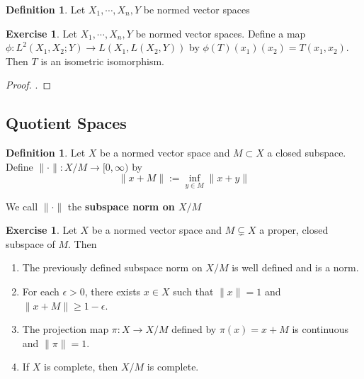 \documentclass[12pt]{amsart}
\theoremstyle{definition}
\newtheorem{defn}[definition]{Definition}
\newtheorem{ex}[definition]{Exercise}
\newcommand{\ep}{\epsilon}
\newcommand{\Rg}{[0,\infty)}
\begin{document}
	
	\begin{defn}
	Let $X_1, \cdots, X_n, Y$ be normed vector spaces
	\end{defn}
	
	
	\begin{ex}
	Let $X_1, \cdots, X_n, Y$ be normed vector spaces. Define a map $\phi: L^2(X_1, X_2;Y) \rightarrow L(X_1, L(X_2, Y))$ by $\phi(T)(x_1)(x_2) = T(x_1, x_2)$. Then $T$ is an isometric isomorphism.
	\end{ex}
	
	\begin{proof}
	. 
	\end{proof}
	
	
	\newpage
	
	
	
	
	
	
	
	
	
	
	
	
	
	
	
	
	
	
	
	
	
	
	
	
	\subsection{Quotient Spaces}	
	
	\begin{defn}
		Let $X$ be a normed vector space and $M \subset X$ a closed subspace. Define $\|\cdot\|:X/M \rightarrow \Rg$ by $$\|x+M\| := \inf_{y \in M}\|x+y\|$$
		
		We call $\|\cdot\|$ the \textbf{subspace norm on $X/M$}
	\end{defn}
	
	\begin{ex}
		Let $X$ be a normed vector space and $M \subsetneq X$ a proper, closed subspace of $M$. 
		Then 
		\begin{enumerate}
			\item The previously defined subspace norm on $X/M$ is well defined and is a norm. 
			\item For each $\ep > 0$, there exists $x \in X$ such that $\|x\|=1$ and $\|x+M\| \geq 1-\ep$.
			\item The projection map $\pi:X \rightarrow X/M$ defined by $\pi(x) = x+M$ is continuous and $\|\pi\|=1$. 
			\item If $X$ is complete, then $X/M$ is complete. 
		\end{enumerate} 
	\end{ex}
	
\end{document}
